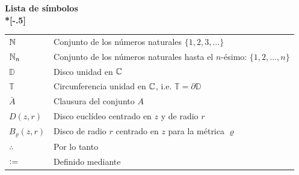 \begin{flushright}
    \Huge\bf Lista de símbolos\\*[-.5\baselineskip]
    \hrulefill
\end{flushright}

\begin{tabular}{ll}
    $\mathbb{N}$ & Conjunto de los números naturales $\{1, 2, 3, \dots\}$ \\
    $\mathbb{N}_n$ & Conjunto de los números naturales hasta el $n$-ésimo: $\{1,2,\dots,n\}$ \\
    $\mathbb{D}$ & Disco unidad en $\mathbb{C}$ \\
    $\mathbb{T}$ & Circunferencia unidad en $\mathbb{C}$, i.e. $\mathbb{T} = \partial \mathbb{D}$ \\
    $\bar{A}$ & Clausura del conjunto $A$ \\
    $D(z, r)$ & Disco euclídeo centrado en $z$ y de radio $r$ \\
    $B_{\varrho}(z, r)$ & Disco de radio $r$ centrado en $z$ para la métrica $\varrho$ \\
    $\therefore$ & Por lo tanto \\
    $\vcentcolon=$ & Definido mediante \\

\end{tabular}
